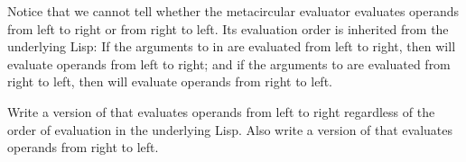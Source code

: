 \begin{exercise}
	\label{Exercise 4.1}
	Notice that we cannot tell whether the metacircular evaluator evaluates operands from left to right or from right to left.
	Its evaluation order is inherited from the underlying Lisp:
	If the arguments to  in  are evaluated from left to right, then  will evaluate operands from left to right;
	and if the arguments to  are evaluated from right to left, then  will evaluate operands from right to left.

	Write a version of  that evaluates operands from left to right regardless of the order of evaluation in the underlying Lisp.
	Also write a version of  that evaluates operands from right to left.
\end{exercise}
